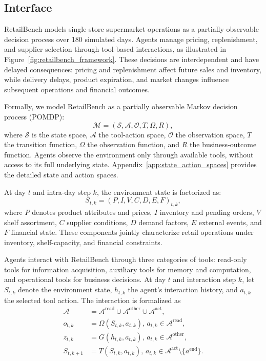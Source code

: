 

\subsection{Interface}

RetailBench models single-store supermarket operations as a partially
observable decision process over 180 simulated days. Agents manage
pricing, replenishment, and supplier selection through tool-based
interactions, as illustrated in Figure~\ref{fig:retailbench_framework}.
These decisions are interdependent and have delayed consequences:
pricing and replenishment affect future sales and inventory, while
delivery delays, product expiration, and market changes influence
subsequent operations and financial outcomes.

Formally, we model RetailBench as a partially observable Markov
decision process (POMDP):
\begin{equation}
\label{eq:pomdp}
\mathcal{M} = (\mathcal{S}, \mathcal{A}, \mathcal{O}, T, \Omega, R),
\end{equation}
where $\mathcal{S}$ is the state space, $\mathcal{A}$ the tool-action
space, $\mathcal{O}$ the observation space, $T$ the transition function,
$\Omega$ the observation function, and $R$ the business-outcome
function. Agents observe the environment only through available tools,
without access to its full underlying state. Appendix~\ref{app:state_action_spaces}
provides the detailed state and action spaces.

At day $t$ and intra-day step $k$, the environment state is
factorized as:
\begin{equation}
\label{eq:latent_state}
S_{t,k} = (P, I, V, C, D, E, F)_{t,k},
\end{equation}
where $P$ denotes product attributes and prices, $I$ inventory and
pending orders, $V$ shelf assortment, $C$ supplier conditions,
$D$ demand factors, $E$ external events, and $F$ financial state.
These components jointly characterize retail operations under
inventory, shelf-capacity, and financial constraints.

Agents interact with RetailBench through three categories of tools:
read-only tools for information acquisition,
auxiliary tools for memory and computation, and
operational tools for business decisions.
At day $t$ and interaction step $k$, let $S_{t,k}$ denote the
environment state, $h_{t,k}$ the agent's interaction history,
and $a_{t,k}$ the selected tool action.
The interaction is formalized as
\begin{equation}
\label{eq:agent_interaction}
\begin{aligned}
\mathcal{A} &=
\mathcal{A}^{\mathrm{read}}
\cup \mathcal{A}^{\mathrm{other}}
\cup \mathcal{A}^{\mathrm{act}},\\
o_{t,k} &= \Omega(S_{t,k},a_{t,k}),
\, a_{t,k}\in\mathcal{A}^{\mathrm{read}},\\
z_{t,k} &= G(h_{t,k},a_{t,k}),
\, a_{t,k}\in\mathcal{A}^{\mathrm{other}},\\
S_{t,k+1} &= T(S_{t,k},a_{t,k}),
\, a_{t,k}\in
\mathcal{A}^{\mathrm{act}}\!\setminus\!\{a^{\mathrm{end}}\}.
\end{aligned}
\end{equation}

